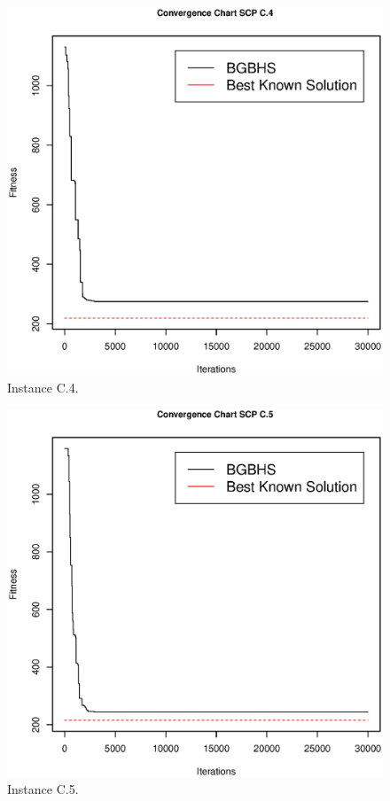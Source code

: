 \begin{figure}[]
\centering
\includegraphics[scale=.45]{Resultados/scpC4.eps}
\caption{Instance C.4.}
\label{fig:Instance.C.4}
\end{figure}

\begin{figure}[]
\centering
\includegraphics[scale=.45]{Resultados/scpC5.eps}
\caption{Instance C.5.}
\label{fig:Instance.C.5}
\end{figure}

